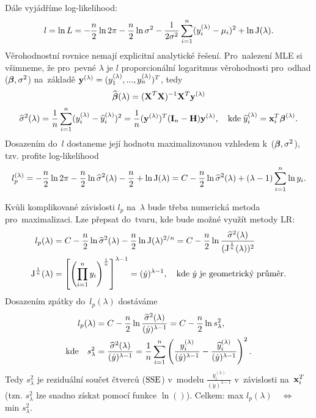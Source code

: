 Dále vyjádříme log-likelihood:
 $$
 l = \ln L = -\frac{n}{2}\ln 2 \pi - \frac{n}{2}\ln \sigma^2 - \frac{1}{2 \sigma^2} \sum\limits_{i=1}^{n} (y_i^{(\lambda)} - \mu_i)^2 + \ln\text{J}(\lambda).
 $$
Věrohodnostní rovnice nemají explicitní analytické řešení. Pro~nalezení MLE si všimneme, že pro~pevné $\lambda$ je $l$ proporcionální logaritmus věrohodnosti pro~odhad ($\boldsymbol{\beta}, \sigma^2$) na~základě $\mathbf{y}^{(\lambda)} = (y_1^{(\lambda)},..., y_n^{(\lambda)})^T$, tedy
 $$
 \widehat{\boldsymbol{\beta}} (\lambda) = {(\textbf{X}^T\textbf{X})^{-1}} \mathbf{X}^T \mathbf{y}^{(\lambda)}
 $$
 $$
 \widehat{\sigma}^2 (\lambda) = \frac{1}{n} \sum\limits_{i=1}^{n} (y_i^{(\lambda)} - \widehat{y} _i^{(\lambda)})^2 = \frac{1}{n} (\mathbf{y}^{(\lambda)})^T (\textbf{I} _n - \textbf{H}) \mathbf{y}^{(\lambda)}, \quad \text{kde} \; \widehat{y}_i^{(\lambda)} = \mathbf{x}_i^T \boldsymbol{\beta}^{(\lambda)}.
 $$
Dosazením do~$l$ dostaneme její hodnotu maximalizovanou vzhledem k~($\boldsymbol{\beta}, \sigma^2$), tzv. profite log-likelihood
 $$
  l_p^{(\lambda)} = -\frac{n}{2} \ln 2 \pi - \frac{n}{2} \ln \widehat{\sigma}^2 (\lambda) - \frac{n}{2} + \ln \text{J}(\lambda)
 = C - \frac{n}{2} \ln \widehat{\sigma}^2 (\lambda) + (\lambda - 1)  \sum\limits_{i=1}^{n} \ln y_i.
 $$
\begin{remark}
Kvůli komplikované závislosti $l_p$ na~$\lambda$ bude třeba numerická metoda pro~maximalizaci. Lze přepsat do~tvaru, kde bude možné využít metody LR:
\begin{align*}
 l_p (\lambda) & = C - \frac{n}{2} \ln \widehat{\sigma}^2 (\lambda)  - \frac{n}{2} \ln\text{J}(\lambda)^{2/n} = C - \frac{n}{2} \ln \frac{ \widehat{\sigma}^2 (\lambda)}{(\text{J}^{\frac{1}{n}}(\lambda))^2} \\
 \text{J}^{\frac{1}{n}}(\lambda) & = \left[\left(\prod_{i = 1}^n y_i \right)^{\frac{1}{n}} \right]^{\lambda - 1} = (\dot{y})^{\lambda - 1}, \quad \text{kde } \dot{y} \text{ je geometrický průměr.}
\end{align*}
Dosazením zpátky do~$l_p(\lambda)$ dostáváme
\begin{align*}
\quad  l_p(\lambda) & = C - \frac{n}{2} \ln \frac{ \widehat{\sigma}^2 (\lambda)}{(\dot{y})^{\lambda - 1}} = C - \frac{n}{2}\ln s_{\lambda}^2, \\
\text{kde} \quad s_{\lambda}^2 & = \frac{ \widehat{\sigma}^2 (\lambda)}{(\dot{y})^{\lambda - 1}} = \frac{1}{n} \sum\limits_{i=1}^{n} \left(\frac{y_i^{(\lambda)}}{(\dot{y})^{\lambda-1}} - \frac{\widehat{y}_i^{(\lambda)}}{(\dot{y})^{\lambda-1}} \right)^2.
\end{align*}
Tedy $s_{\lambda}^2$ je reziduální součet čtverců ($\mathrm{SSE}$) v~modelu $\frac{y_i^{(\lambda)}}{(\dot{y})^{\lambda-1}}$ v~závislosti na~$\mathbf{x}_i^T$ (tzn. $s_{\lambda}^2$ lze snadno získat pomocí funkce $\ln()$). Celkem: max $l_p(\lambda) \quad \Leftrightarrow \quad$ min $s_{\lambda}^2$.
\end{remark}

